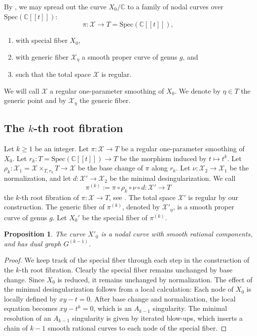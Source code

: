 \documentclass[11pt]{amsart}
\newtheorem{proposition}{Proposition}
\newcommand{\cX}{\mathcal X}
\begin{document}
By \cite[Theorem B.2]{MR2448666}, we may spread out the curve $X_0/\mathbb{C}$ to a family of nodal curves over $\mathrm{Spec}(\mathbb{C}[[t]])$: $$\pi\colon\mathcal{X}\to T=\mathrm{Spec}(\mathbb{C}[[t]]),$$ 
\begin{enumerate}
 \item with special fiber $X_0$, 
 \item with generic fiber $\cX_\eta$ a smooth proper curve of genus $g$, and
 \item such that the total space $\mathcal{X}$ is regular.
\end{enumerate}
We will call $\mathcal X$ a regular one-parameter smoothing of $X_0$. We denote by $\eta\in T$ the generic point and by $\mathcal{X}_\eta$ the generic fiber.
 
\subsection{The $k$-th root fibration} Let $k\geq1$ be an integer. Let $\pi\colon \mathcal{X}\to T$ be a regular one-parameter smoothing of $X_0$.
Let $r_k\colon T=\mathrm{Spec}(\mathbb{C}[[t]])\to T$ be the morphism induced by $t\mapsto t^k$. Let $\rho_k\colon\mathcal{X}_1=\mathcal{X}\times_{T,r_k}T\to\mathcal{X}$ be the base change of $\pi$ along $r_k$. Let $\nu\colon\mathcal{X}_2\to\mathcal{X}_1$ be the normalization, and let $d\colon\mathcal{X}'\to\mathcal{X}_2$ be the minimal desingularization. We call $$\pi^{(k)}:=\pi\circ\rho_k\circ\nu\circ d\colon \mathcal{X}'\to T$$ the $k$-th root fibration of $\pi\colon\mathcal{X}\to T$, see \cite[III.9]{MR749574}. The total space $\mathcal{X}'$ is regular by our construction. The generic fiber of $\pi^{(k)}$, denoted by $
\mathcal{X}'_\eta$, is a smooth proper curve of genus $g$. Let $X_0'$ be the special fiber of $\pi^{(k)}$.
\begin{proposition} \label{prop:dual graph}
The curve $X'_0$ is a nodal curve with smooth rational components, and has dual graph $G^{(k - 1)}$.
\end{proposition}
\begin{proof}
We keep track of the special fiber through each step in the construction of the $k$-th root fibration. Clearly 
the special fiber remains unchanged by base change. Since $X_0$ is reduced, it remains unchanged by normalization. The effect of the minimal desingularization 
follows from a local calculation: Each node of $X_0$ is locally defined by $xy-t=0$. After base change and normalization, the local equation becomes $xy-t^k=0$, which is an $A_{k-1}$ singularity. The minimal resolution of an $A_{k-1}$
singularity is given by iterated blow-ups, which inserts a chain of $k - 1$ smooth rational curves to each node of the special fiber.
\end{proof}
\end{document}
